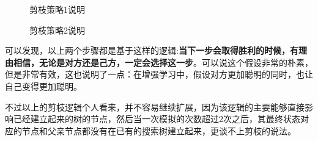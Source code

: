 \documentclass[9pt,twocolumn,twoside]{osajnl}
\begin{document}
\begin{adjustwidth}{2em}{}
	\begin{figure}[htbp]
		\centering
		\caption{剪枝策略1说明}
		\label{fig:false-color}
	\end{figure}
	\begin{figure}[htbp]
		\centering
		\caption{剪枝策略2说明}
		\label{fig:false-color}
	\end{figure}
	
	可以发现，以上两个步骤都是基于这样的逻辑:\textbf{当下一步会取得胜利的时候，有理由相信，无论是对方还是己方，一定会选择这一步}。可以说这个假设非常的朴素，但是非常有效，这也说明了一点：在增强学习中，假设对方更加聪明的同时，也让自己变得更加聪明。
	
	不过以上的剪枝逻辑个人看来，并不容易继续扩展，因为该逻辑的主要能够直接影响已经建立起来的树的节点，然后当一次模拟的次数超过2次之后，其最终状态对应的节点和父亲节点都没有在已有的搜索树建立起来，更谈不上剪枝的说法。
	
	
	
\end{adjustwidth}
\end{document}
